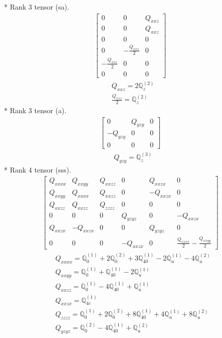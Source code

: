 \documentclass[fleqn,8pt,landscape]{jsarticle}
\begin{document}
* Rank 3 tensor (sa).
\begin{align*}
\begin{bmatrix} 0 & 0 & Q_{xxz} \\ 0 & 0 & Q_{xxz} \\ 0 & 0 & 0 \\ 0 & - \frac{Q_{xxz}}{2} & 0 \\ - \frac{Q_{xxz}}{2} & 0 & 0 \\ 0 & 0 & 0 \end{bmatrix}
\end{align*}
\begin{align*}
& Q_{xxz} = 2 \mathbb{Q}_{z}^{(2)} \\
& \frac{Q_{xxz}}{2} = \mathbb{Q}_{z}^{(2)}
\end{align*}
* Rank 3 tensor (a).
\begin{align*}
\begin{bmatrix} 0 & Q_{yzy} & 0 \\ - Q_{yzy} & 0 & 0 \\ 0 & 0 & 0 \end{bmatrix}
\end{align*}
\begin{align*}
& Q_{yzy} = \mathbb{Q}_{z}^{(3)}
\end{align*}
* Rank 4 tensor (sss).
\begin{align*}
\begin{bmatrix} Q_{xxxx} & Q_{xxyy} & Q_{xxzz} & 0 & Q_{xxzx} & 0 \\ Q_{xxyy} & Q_{xxxx} & Q_{xxzz} & 0 & - Q_{xxzx} & 0 \\ Q_{xxzz} & Q_{xxzz} & Q_{zzzz} & 0 & 0 & 0 \\ 0 & 0 & 0 & Q_{yzyz} & 0 & - Q_{xxzx} \\ Q_{xxzx} & - Q_{xxzx} & 0 & 0 & Q_{yzyz} & 0 \\ 0 & 0 & 0 & - Q_{xxzx} & 0 & \frac{Q_{xxxx}}{2} - \frac{Q_{xxyy}}{2} \end{bmatrix}
\end{align*}
\begin{align*}
& Q_{xxxx} = \mathbb{Q}_{0}^{(1)} + 2 \mathbb{Q}_{0}^{(2)} + 3 \mathbb{Q}_{40}^{(1)} - 2 \mathbb{Q}_{u}^{(1)} - 4 \mathbb{Q}_{u}^{(2)} \\
& Q_{xxyy} = \mathbb{Q}_{0}^{(1)} + \mathbb{Q}_{40}^{(1)} - 2 \mathbb{Q}_{u}^{(1)} \\
& Q_{xxzz} = \mathbb{Q}_{0}^{(1)} - 4 \mathbb{Q}_{40}^{(1)} + \mathbb{Q}_{u}^{(1)} \\
& Q_{xxzx} = \mathbb{Q}_{4c}^{(1)} \\
& Q_{zzzz} = \mathbb{Q}_{0}^{(1)} + 2 \mathbb{Q}_{0}^{(2)} + 8 \mathbb{Q}_{40}^{(1)} + 4 \mathbb{Q}_{u}^{(1)} + 8 \mathbb{Q}_{u}^{(2)} \\
& Q_{yzyz} = \mathbb{Q}_{0}^{(2)} - 4 \mathbb{Q}_{40}^{(1)} + \mathbb{Q}_{u}^{(2)}
\end{align*}
\end{document}
